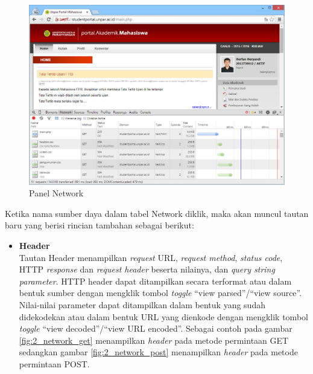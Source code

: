 \documentclass[a4paper,twoside]{article}
\begin{document}
\begin{enumerate}
\begin{enumerate}
\begin{figure}[H]
	\centering
	\includegraphics[scale=0.5]{Gambar/network-panel}
	\caption{Panel Network} 
	\label{fig:2_network_panel}
\end{figure}

Ketika nama sumber daya dalam tabel Network diklik, maka akan muncul tautan baru yang berisi rincian tambahan sebagai berikut:
\begin{itemize}
	\item \textbf{Header}\\
	Tautan Header menampilkan \textit{request} URL, \textit{request method}, \textit{status code}, HTTP \textit{response} dan \textit{request header} beserta nilainya, dan \textit{query string parameter}. HTTP header dapat ditampilkan secara terformat atau dalam bentuk sumber dengan mengklik tombol \textit{toggle} ``view parsed''/``view source''. Nilai-nilai parameter dapat ditampilkan dalam bentuk yang sudah didekodekan atau dalam bentuk URL yang dienkode dengan mengklik tombol \textit{toggle} ``view decoded''/``view URL encoded''. Sebagai contoh pada gambar \ref{fig:2_network_get} menampilkan \textit{header} pada metode permintaan GET sedangkan gambar \ref{fig:2_network_post} menampilkan \textit{header} pada metode permintaan POST.
	

\end{itemize}
\end{enumerate}
\end{enumerate}
\end{document}
